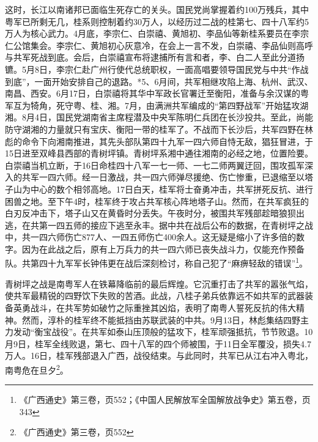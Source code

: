 这时，长江以南诸邦已面临生死存亡的关头。国民党尚掌握着约100万残兵，其中粤军已所剩无几，桂系则控制着约30万人，以经历过二战的桂第七、四十八军约5万人为核心武力。4月底，李宗仁、白崇禧、黄旭初、李品仙等新桂系要员在李宗仁公馆集会。李宗仁、黄旭初心灰意冷，在会上一言不发，白崇禧、李品仙则高呼与共军死战到底。会后，白崇禧宣布将逮捕所有言和者，李、白二人至此分道扬镳。5月8日，李宗仁赴广州行使代总统职权，一面高唱要领导国民党与中共“作战到底”，一面开始安排自己的退路。*5、6月间，共军相继攻陷上海、杭州、武汉、南昌、西安。6月17日，白崇禧将其华中军政长官署迁至衡阳，准备与余汉谋的粤军互为犄角，死守粤、桂、湘。7月，由满洲共军编成的“第四野战军”开始猛攻湖湘。8月4日，国民党湖南省主席程潜及中央军陈明仁兵团在长沙投共。至此，尚能防守湖湘的力量就只有宝庆、衡阳一带的桂军了。不战而下长沙后，共军四野在林彪的命令下向湘南推进，其先头部队第四十九军一四六师自恃无敌，猖狂冒进，于15日进至双峰县西部的青树坪镇。青树坪系湘中通往湘南的必经之地，位置险要。白崇禧当机立断，于16日命桂四十八军一七一师、一七二师两翼迂回，围攻孤军深入的共军一四六师。经一日激战，共一四六师弹尽援绝、伤亡惨重，已退缩至以塔子山为中心的数个相邻高地。17日白天，桂军将士奋勇冲击，共军拼死反抗、进行困兽之地。至下午4时，桂军终于攻占共军核心阵地塔子山。然而，在共军疯狂的白刃反冲击下，塔子山又在黄昏时分丢失。午夜时分，被围共军残部趁暗狼狈出逃，在共第一四五师的接应下逃至永丰。据中共在战后公布的数据，在青树坪之战中，共一四六师伤亡877人、一四五师伤亡400余人。这无疑是缩小了许多倍的数字。因为在此战之后，原有上万兵力的共一四六师已丧失战斗力，仅能充作预备队。共第四十九军军长钟伟更在战后深刻检讨，称自己犯了“麻痹轻敌的错误”\footnote{《广西通史》第三卷，页552；《中国人民解放军全国解放战争史》第五卷，页343}。

青树坪之战是南粤军人在铁幕降临前的最后辉煌。它沉重打击了共军的嚣张气焰，使共军最精锐的四野饮下失败的苦酒。此战，八桂子弟兵依靠远不如共军的武器装备英勇战斗，在共军势如破竹之际重挫其凶焰，表明了南粤人誓死反抗的伟大精神。然而，淳朴的桂军终不能抵挡由苏联武装的中共。9月13日，林彪集结四野主力发动“衡宝战役”。在共军如泰山压顶般的猛攻下，桂军顽强抵抗，节节败退。10月9日，桂军全线败退，第七、四十八军的四个师被围，于11日全军覆没，损失4.7万人。16日，桂军残部退入广西，战役结束。与此同时，共军已从江右冲入粤北，南粤危在旦夕\footnote{《广西通史》第三卷，页552}。

